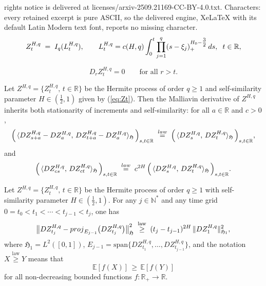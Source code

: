 \documentclass[10pt,a4paper]{amsart}
\newcommand\HHH{\mathfrak{H}}
\newcommand{\N}{\mathbb{N}}
\newcommand{\R}{\mathbb{R}}
\begin{document}
rights notice is delivered at licenses/arxiv-2509.21169-CC-BY-4.0.txt. Characters: every retained excerpt is pure ASCII, so the delivered engine, XeLaTeX with its default Latin Modern text font, reports no missing character.
\begin{equation}\label{eq:Zt}
Z_t^{H,q} \;=\; I_q(L_t^{H,q}), \qquad 
L_t^{H,q} = c(H,q)\int_0^t \prod_{j=1}^q (s-\xi_j)_{+}^{H_0-\tfrac32}\,ds, \hskip0.2cm t\in \R,
\end{equation}

  \begin{equation}\label{eq:adapt}
  D_r Z_t^{H,q} = 0 \qquad \text{for all } r>t.
  \end{equation}

\begin{Prop}\label{Prop:Zt9999}
Let $Z^{H,q}=\{Z^{H,q}_t,\,t\in\R\}$ be the Hermite process of order $q\ge1$ and self-similarity parameter $H\in(\tfrac12,1)$  given by (\ref{eq:Zt}).  
Then the Malliavin derivative of $Z^{H,q}$ inherits both stationarity of increments and self-similarity: for all $a\in\R$ and $c>0$,
\[
\Big(\,\langle DZ^{H,q}_{s+a}-DZ^{H,q}_{a},\, DZ^{H,q}_{t+a}-DZ^{H,q}_{a}\rangle_{\HHH}\,\Big)_{s,t\in\R}
\;\overset{\rm law}{=}\;
\Big(\,\langle DZ^{H,q}_{s},\, DZ^{H,q}_{t}\rangle_{\HHH}\,\Big)_{s,t\in\R},
\]
and
\[
\Big(\,\langle DZ^{H,q}_{cs},\, DZ^{H,q}_{ct}\rangle_{\HHH}\,\Big)_{s,t\in\R}
\;\overset{\rm law}{=}\; c^{2H}\,
\Big(\,\langle DZ^{H,q}_{s},\, DZ^{H,q}_{t}\rangle_{\HHH}\,\Big)_{s,t\in\R}.
\]
\end{Prop}

\begin{Thm}\label{Thm:MLNDDiscrete}
Let $Z^{H,q}=\{Z^{H,q}_t,\,t\in\R\}$ be the Hermite process of order $q\ge1$ with self-similarity parameter $H\in(\tfrac12,1)$.  
For any $j\in\N^*$ and any time grid $0=t_0<t_1<\cdots<t_{j-1}<t_j$, one has
\begin{align}\label{9i-1}
\big\| DZ^{H,q}_{t_j} - {\rm proj}_{E_{j-1}}\big(DZ^{H,q}_{t_j}\big) \big\|_{\HHH}^2
\;\overset{\text{law}}{\ge}\; (t_j-t_{j-1})^{2H}\,\|DZ^{H,q}_1\|_{\HHH_{1}}^2,
\end{align}
where $\HHH_1=L^2([0,1])$, $E_{j-1}=\mathrm{span}\{DZ^{H,q}_{t_1},\ldots,DZ^{H,q}_{t_{j-1}}\}$, 
and the notation $X\overset{\text{law}}{\ge}Y$ means that
\[
\mathbb{E}[f(X)] \,\geq\, \mathbb{E}[f(Y)]
\]
for all non-decreasing bounded functions $f:\R_+\to\R$.
\end{Thm}
\end{document}
